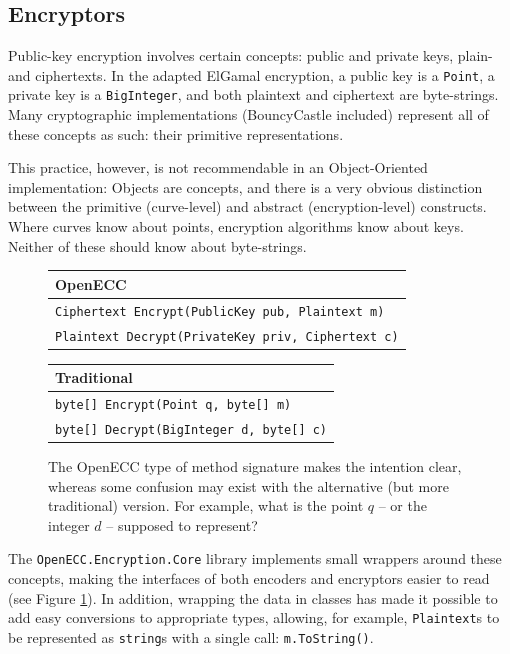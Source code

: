 \subsection{Encryptors}

Public-key encryption involves certain concepts: public and private keys, plain- and ciphertexts. In the adapted ElGamal encryption,
a public key is a \verb+Point+, a private key is a \verb+BigInteger+, and both plaintext and ciphertext are byte-strings. Many
cryptographic implementations (BouncyCastle included) represent all of these concepts as such: their primitive representations.

This practice, however, is not recommendable in an Object-Oriented implementation: Objects are concepts, and there is a very obvious
distinction between the primitive (curve-level) and abstract (encryption-level) constructs. Where curves know about points, encryption
algorithms know about keys. Neither of these should know about byte-strings.

\begin{figure}[htb]
    \begin{tabular}{|p{\textwidth}|}
        \hline
        \textbf{OpenECC} \\
        \hline
        \texttt{Ciphertext Encrypt(PublicKey pub, Plaintext m)} \\
        \texttt{Plaintext Decrypt(PrivateKey priv, Ciphertext c)} \\
        \hline
    \end{tabular}
    
    \begin{tabular}{|p{\textwidth}|}
        \hline
        \textbf{Traditional} \\
        \hline
        \texttt{byte[] Encrypt(Point q, byte[] m)} \\
        \texttt{byte[] Decrypt(BigInteger d, byte[] c)} \\
        \hline
    \end{tabular}

    \caption{The OpenECC type of method signature makes the intention clear, whereas some confusion may exist with the alternative
        (but more traditional) version. For example, what is the point \(q\) -- or the integer \(d\) -- supposed to represent?}
    \label{fig:encryptor_method_signatures}
\end{figure}

The \verb+OpenECC.Encryption.Core+ library implements small wrappers around these concepts, making the interfaces of both encoders and
encryptors easier to read (see Figure \ref{fig:encryptor_method_signatures}). In addition, wrapping the data in classes has made it
possible to add easy conversions to appropriate types, allowing, for example, \verb+Plaintext+s to be represented as \verb+string+s with
a single call: \verb+m.ToString()+.


